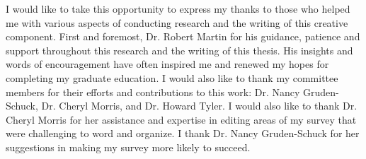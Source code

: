 
I would like to take this opportunity to express my thanks to those
who helped me with various aspects of conducting research and the writing
of this creative component.
First and foremost, Dr. Robert Martin for his guidance, patience and support
throughout this research and the writing of this thesis.
His insights and words of encouragement have often inspired me and renewed
my hopes for completing my graduate education.
I would also like to thank my committee members for their efforts
and contributions to this work: Dr. Nancy Gruden-Schuck, Dr. Cheryl Morris, and
Dr. Howard Tyler.
I would also like to thank Dr. Cheryl Morris for her assistance and expertise in 
editing areas of my survey that were challenging to word and organize. I thank 
Dr. Nancy Gruden-Schuck for her suggestions in making my survey more likely to succeed.